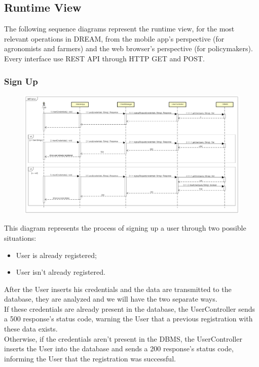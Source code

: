 \newpage

\subsection{Runtime View}
The following sequence diagrams represent the runtime view, for the most relevant operations in DREAM, 
from the mobile app's perspective (for agronomists and farmers) and the web browser's perspective (for policymakers).\\
Every interface use REST API through HTTP GET and POST.

\subsubsection{Sign Up}

\begin{figure}[H]
    \begin{center}
        \includegraphics[width=\textwidth]{Images/SequenceDiagrams/SignupDD.png}
    \end{center}
\end{figure}

This diagram represents the process of signing up a user through two possible situations: 
\begin{itemize}
    \item User is already registered;
    \item User isn't already registered.
\end{itemize}
After the User inserts his credentials and the data are transmitted to the database, 
they are analyzed and we will have the two separate ways.\\
If these credentials are already present in the database, the UserController 
sends a 500 response's status code, warning the User that a previous registration with these data exists.\\
Otherwise, if the credentials aren't present in the DBMS, the UserController inserts the User 
into the database and sends a 200 response's status code, informing the User that the registration was successful.


